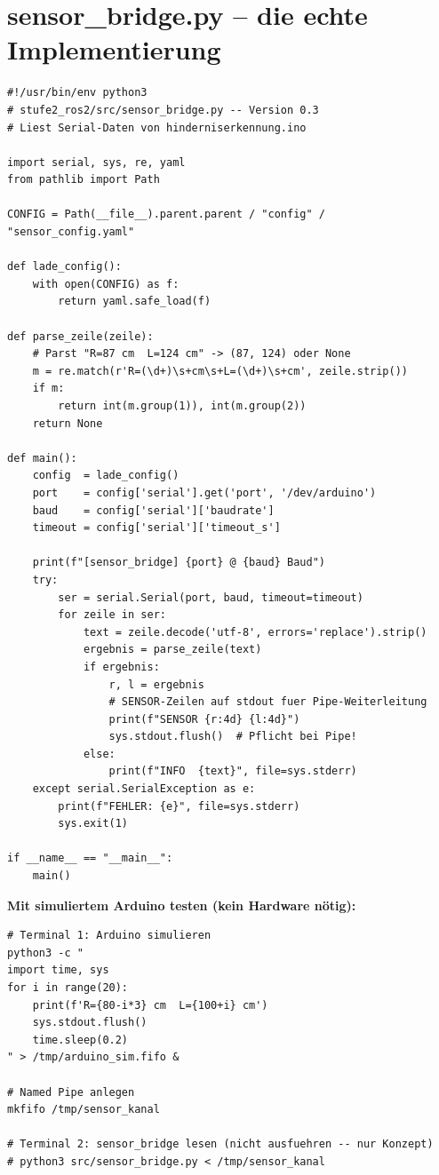 \section{sensor\_bridge.py -- die echte Implementierung}

\begin{lstlisting}[style=python]
#!/usr/bin/env python3
# stufe2_ros2/src/sensor_bridge.py -- Version 0.3
# Liest Serial-Daten von hinderniserkennung.ino

import serial, sys, re, yaml
from pathlib import Path

CONFIG = Path(__file__).parent.parent / "config" / "sensor_config.yaml"

def lade_config():
    with open(CONFIG) as f:
        return yaml.safe_load(f)

def parse_zeile(zeile):
    # Parst "R=87 cm  L=124 cm" -> (87, 124) oder None
    m = re.match(r'R=(\d+)\s+cm\s+L=(\d+)\s+cm', zeile.strip())
    if m:
        return int(m.group(1)), int(m.group(2))
    return None

def main():
    config  = lade_config()
    port    = config['serial'].get('port', '/dev/arduino')
    baud    = config['serial']['baudrate']
    timeout = config['serial']['timeout_s']

    print(f"[sensor_bridge] {port} @ {baud} Baud")
    try:
        ser = serial.Serial(port, baud, timeout=timeout)
        for zeile in ser:
            text = zeile.decode('utf-8', errors='replace').strip()
            ergebnis = parse_zeile(text)
            if ergebnis:
                r, l = ergebnis
                # SENSOR-Zeilen auf stdout fuer Pipe-Weiterleitung
                print(f"SENSOR {r:4d} {l:4d}")
                sys.stdout.flush()  # Pflicht bei Pipe!
            else:
                print(f"INFO  {text}", file=sys.stderr)
    except serial.SerialException as e:
        print(f"FEHLER: {e}", file=sys.stderr)
        sys.exit(1)

if __name__ == "__main__":
    main()
\end{lstlisting}

\begin{loesungBox}
\textbf{Mit simuliertem Arduino testen (kein Hardware nötig):}
\begin{lstlisting}[style=bash]
# Terminal 1: Arduino simulieren
python3 -c "
import time, sys
for i in range(20):
    print(f'R={80-i*3} cm  L={100+i} cm')
    sys.stdout.flush()
    time.sleep(0.2)
" > /tmp/arduino_sim.fifo &

# Named Pipe anlegen
mkfifo /tmp/sensor_kanal

# Terminal 2: sensor_bridge lesen (nicht ausfuehren -- nur Konzept)
# python3 src/sensor_bridge.py < /tmp/sensor_kanal
\end{lstlisting}
\end{loesungBox}

